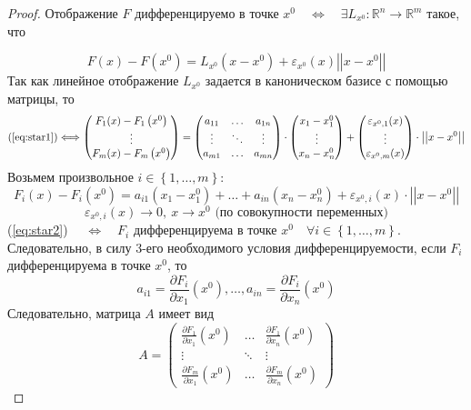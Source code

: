 \documentclass[11pt]{article}
\begin{document}
\begin{proof}
    Отображение $F$ дифференцируемо в точке $x^0 \quad \Longleftrightarrow \quad \exists 
    L_{x^0}: \mathbb{R}^n \to \mathbb{R}^m$ такое, что 
    
    \[ F(x) - F\left(x^0\right) = L_{x^0}\left(x - x^0\right) + \varepsilon_{x^0}(x)\left|\left|x - x^0\right|\right| \tag{$\ast$}\label{eq:star1}\]
    Так как линейное отображение $L_{x^0}$ задается в каноническом базисе с помощью матрицы, то 
    \[ \text{(\ref{eq:star1})} \Longleftrightarrow 
    \begin{pmatrix}
        F_1(x) - F_1\left(x^0\right) \\ \vdots \\ F_m(x) - F_m\left(x^0\right)
    \end{pmatrix} = 
    \begin{pmatrix}
        a_{11} & \dots & a_{1n} \\ 
        \vdots & \ddots & \vdots \\ 
        a_{m1} & \dots & a_{mn} 
    \end{pmatrix} \cdot 
    \begin{pmatrix}
        x_1 - x_1^0 \\ \vdots \\ x_n - x_n^0
    \end{pmatrix} + 
    \begin{pmatrix}
        \varepsilon_{x^0, 1}(x) \\ \vdots \\ \varepsilon_{x^0, m}(x)
    \end{pmatrix} \cdot \left|\left|x - x^0\right|\right|
    \]
    Возьмем произвольное $i \in \left\{1, \dots, m\right\}:$ 
    \[F_i(x) - F_i\left(x^0\right) = a_{i1}\left(x_1 - x_1^0\right) + \dots + a_{in}\left(x_n - x_n^0\right) + 
    \varepsilon_{x^0, i}(x) \cdot  \left|\left|x - x^0\right|\right| \tag{$\ast \ast$}\label{eq:star2}\]
    \[\varepsilon_{x^0, i}(x) \to 0, \ x \to x^0 \text{ (по совокупности переменных)}\]
    (\ref{eq:star2}) $\quad \Longleftrightarrow \quad F_i$ дифференцируема в точке $x^0 \quad \forall i \in \left\{1, \dots, m\right\}$.
    Следовательно, в силу 3-его необходимого условия дифференцируемости, если $F_i$
    дифференцируема в точке $x^0$, то \[a_{i1} = \frac{\partial F_i}{\partial x_1}\left(x^0\right), \dots, a_{in} = \frac{\partial F_i}{\partial x_n}\left(x^0\right)\]
    Следовательно, матрица $A$ имеет вид 
    \[ A = \begin{pmatrix}
        \displaystyle \frac{\partial F_1}{\partial x_1}\left(x^0\right) & \dots & \displaystyle \frac{\partial F_1}{\partial x_n}\left(x^0\right) \\
        \vdots & \ddots & \vdots \\ 
        \displaystyle \frac{\partial F_m}{\partial x_1}\left(x^0\right) & \dots & \displaystyle \frac{\partial F_m}{\partial x_n}\left(x^0\right)
    \end{pmatrix}\]
\end{proof}
\end{document}
